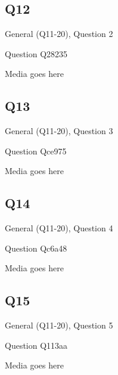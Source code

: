 \documentclass[11pt]{beamer}
\begin{document}
\subsection*{Q12}
\begin{frame}[t]{General (Q11-20), Question 2}
\vspace{2em}
\begin{block}{Question}
Q28235
\end{block}
\begin{center}
Media goes here
\end{center}
\end{frame}
    

\subsection*{Q13}
\begin{frame}[t]{General (Q11-20), Question 3}
\vspace{2em}
\begin{block}{Question}
Qce975
\end{block}
\begin{center}
Media goes here
\end{center}
\end{frame}
    

\subsection*{Q14}
\begin{frame}[t]{General (Q11-20), Question 4}
\vspace{2em}
\begin{block}{Question}
Qc6a48
\end{block}
\begin{center}
Media goes here
\end{center}
\end{frame}
    

\subsection*{Q15}
\begin{frame}[t]{General (Q11-20), Question 5}
\vspace{2em}
\begin{block}{Question}
Q113aa
\end{block}
\begin{center}
Media goes here
\end{center}
\end{frame}
    
\end{document}
